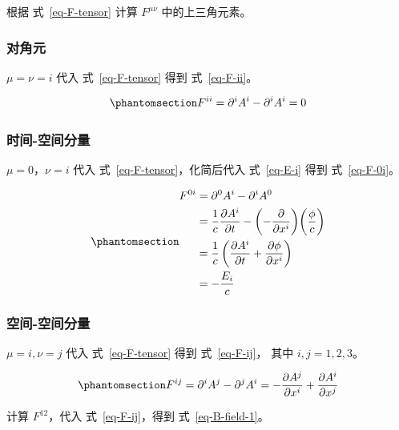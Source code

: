 \documentclass[
  chinese,
  a4paper,
  UTF8,
  12pt,
  oneside,
  openany]{ctexbook}
\theoremstyle{plain}
\theoremstyle{plain}
\theoremstyle{plain}
\theoremstyle{definition}
\theoremstyle{plain}
\theoremstyle{plain}
\theoremstyle{remark}
\begin{document}
根据 式~\ref{eq-F-tensor} 计算 \(F^{\mu\nu}\) 中的上三角元素。

\subsubsection{对角元}\label{ux5bf9ux89d2ux5143}

\(\mu = \nu = i\) 代入 式~\ref{eq-F-tensor} 得到 式~\ref{eq-F-ii}。

\begin{equation}\protect\phantomsection\label{eq-F-ii}{
F^{ii} = \partial^{i}A^i - \partial^{i}A^i = 0
}\end{equation}

\subsubsection{时间-空间分量}\label{ux65f6ux95f4-ux7a7aux95f4ux5206ux91cf}

\(\mu = 0\)，\(\nu = i\) 代入 式~\ref{eq-F-tensor}，化简后代入
式~\ref{eq-E-i} 得到 式~\ref{eq-F-0i}。

\begin{equation}\protect\phantomsection\label{eq-F-0i}{
\begin{aligned}
F^{0i}
&= \partial^{0}A^i - \partial^{i}A^0 \\
&= \frac{1}{c}\frac{\partial A^i}{\partial t}
- \biggl(-\frac{\partial}{\partial x^{i}}\biggr)\biggl(\frac{\phi}{c} \biggr) \\
&= \frac{1}{c}\left(\frac{\partial A^i}{\partial t}
+ \frac{\partial\phi}{\partial x^{i}} \right) \\
&= -\frac{E_{i}}{c}
\end{aligned}
}\end{equation}

\subsubsection{空间-空间分量}\label{ux7a7aux95f4-ux7a7aux95f4ux5206ux91cf}

\(\mu = i,\nu = j\) 代入 式~\ref{eq-F-tensor} 得到 式~\ref{eq-F-ij}，
其中 \(i,j = 1,2,3\)。

\begin{equation}\protect\phantomsection\label{eq-F-ij}{
F^{ij} = \partial^{i}A^j - \partial^{j}A^i= -\frac{\partial A^j}{\partial x^{i}} + \frac{\partial A^i}{\partial x^{j}}
}\end{equation}

计算 \(F^{12}\)，代入 式~\ref{eq-F-ij}，得到 式~\ref{eq-B-field-1}。
\end{document}
